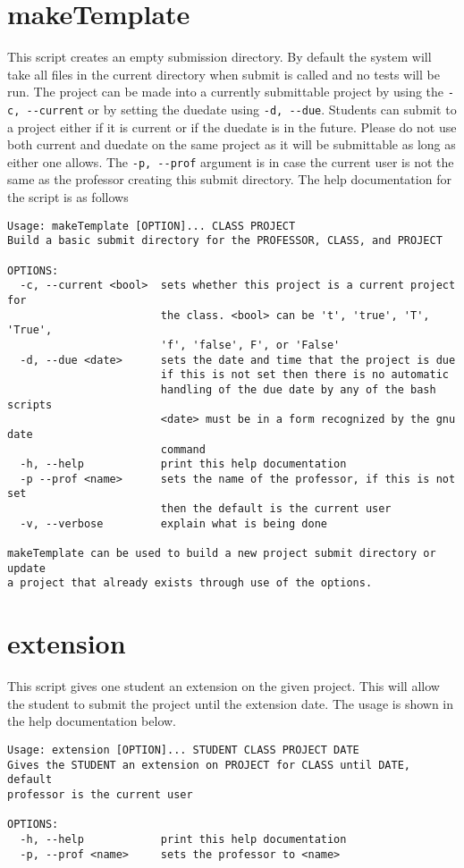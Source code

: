 \documentclass{article}
\begin{document}
\section{makeTemplate}
This script creates an empty submission directory. By default the system will take all files in the current directory when submit is called and no tests will be run. The project can be made into a currently submittable project by using the \verb|-c, --current| or by setting the duedate using \verb|-d, --due|. Students can submit to a project either if it is current or if the duedate is in the future. Please do not use both current and duedate on the same project as it will be submittable as long as either one allows. The \verb|-p, --prof| argument is in case the current user is not the same as the professor creating this submit directory. The help documentation for the script is as follows
\begin{verbatim}
Usage: makeTemplate [OPTION]... CLASS PROJECT
Build a basic submit directory for the PROFESSOR, CLASS, and PROJECT

OPTIONS:
  -c, --current <bool>  sets whether this project is a current project for
                        the class. <bool> can be 't', 'true', 'T', 'True',
                        'f', 'false', F', or 'False'
  -d, --due <date>      sets the date and time that the project is due
                        if this is not set then there is no automatic
                        handling of the due date by any of the bash scripts
                        <date> must be in a form recognized by the gnu date
                        command
  -h, --help            print this help documentation
  -p --prof <name>      sets the name of the professor, if this is not set
                        then the default is the current user
  -v, --verbose         explain what is being done

makeTemplate can be used to build a new project submit directory or update
a project that already exists through use of the options.
\end{verbatim}
\section{extension}
This script gives one student an extension on the given project. This will allow the student to submit the project until the extension date. The usage is shown in the help documentation below.
\begin{verbatim}
Usage: extension [OPTION]... STUDENT CLASS PROJECT DATE
Gives the STUDENT an extension on PROJECT for CLASS until DATE, default
professor is the current user

OPTIONS:
  -h, --help            print this help documentation
  -p, --prof <name>     sets the professor to <name>
\end{verbatim}
\end{document}
